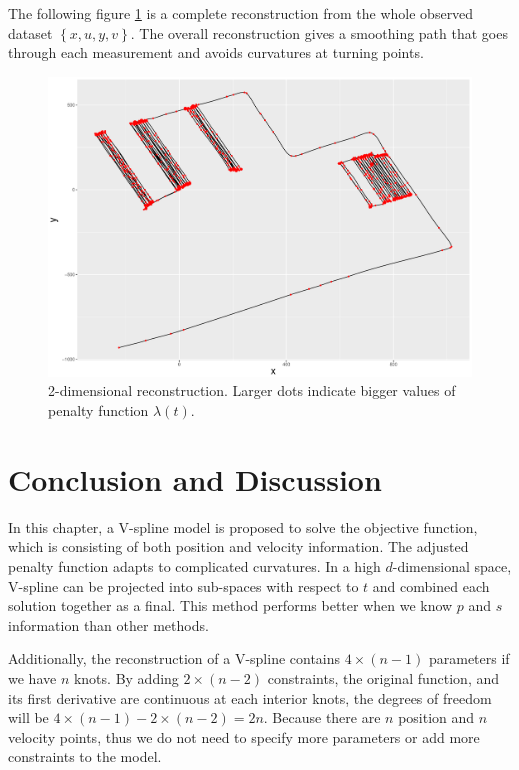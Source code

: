 The following figure \ref{complete2DXY} is a complete reconstruction from the whole observed dataset $\left\lbrace x,u,y,v\right\rbrace$. The overall reconstruction gives a smoothing path that goes through each measurement and avoids curvatures at turning points. 
\begin{figure}
\centering
\includegraphics[width=0.9\linewidth]{Chapters/02TractorSplineTheory/plot/ggplot/ggRealdataCompleteXY.pdf}
\caption{2-dimensional reconstruction. Larger dots indicate bigger values of penalty function $\lambda(t)$.}\label{complete2DXY}
\end{figure}



\section{Conclusion and Discussion}

In this chapter, a V-spline model is proposed to solve the objective function, which is consisting of both position and velocity information. The adjusted penalty function adapts to complicated curvatures. In a high $d$-dimensional space, V-spline can be projected into sub-spaces with respect to $t$ and combined each solution together as a final. This method performs better when we know $p$ and $s$ information than other methods. 

Additionally, the reconstruction of a V-spline contains $4\times (n-1)$ parameters if we have $n$ knots. By adding $2\times (n-2)$ constraints, the original function, and its first derivative are continuous at each interior knots, the degrees of freedom will be $4\times (n-1)-2\times (n-2)=2n$. Because there are $n$ position and $n$ velocity points, thus we do not need to specify more parameters or add more constraints to the model. 

